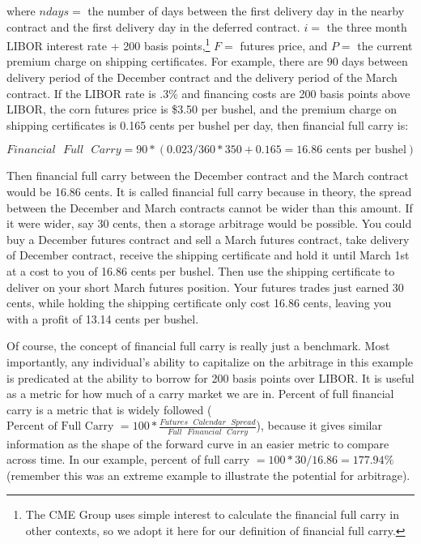 \documentclass[
]{book}
\begin{document}
where \(ndays =\) the number of days between the first delivery day in the nearby contract and the first delivery day in the deferred contract. \(i =\) the three month LIBOR interest rate + 200 basis points,\footnote{The CME Group uses simple interest to calculate the financial full carry in other contexts, so we adopt it here for our definition of financial full carry.} \(F =\) futures price, and \(P =\) the current premium charge on shipping certificates. For example, there are 90 days between delivery period of the December contract and the delivery period of the March contract. If the LIBOR rate is .3\% and financing costs are 200 basis points above LIBOR, the corn futures price is \$3.50 per bushel, and the premium charge on shipping certificates is 0.165 cents per bushel per day, then financial full carry is:

\[Financial \text{  } Full \text{  } Carry = 90*(0.023/360*350 + 0.165 = 16.86 \text{ cents per bushel}) \]

Then financial full carry between the December contract and the March contract would be 16.86 cents. It is called financial full carry because in theory, the spread between the December and March contracts cannot be wider than this amount. If it were wider, say 30 cents, then a storage arbitrage would be possible. You could buy a December futures contract and sell a March futures contract, take delivery of December contract, receive the shipping certificate and hold it until March 1st at a cost to you of 16.86 cents per bushel. Then use the shipping certificate to deliver on your short March futures position. Your futures trades just earned 30 cents, while holding the shipping certificate only cost 16.86 cents, leaving you with a profit of 13.14 cents per bushel.

Of course, the concept of financial full carry is really just a benchmark. Most importantly, any individual's ability to capitalize on the arbitrage in this example is predicated at the ability to borrow for 200 basis points over LIBOR. It is useful as a metric for how much of a carry market we are in. Percent of full financial carry is a metric that is widely followed (\(\text{Percent of Full Carry } = 100*\frac{Futures \text{  } Calendar \text{  } Spread}{Full \text{  } Financial\text{  } Carry}\)), because it gives similar information as the shape of the forward curve in an easier metric to compare across time. In our example, percent of full carry \(=100*30/16.86 = 177.94\%\) (remember this was an extreme example to illustrate the potential for arbitrage).
\end{document}
